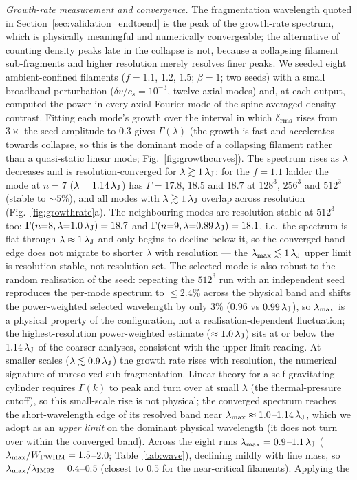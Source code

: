 \documentclass[usenatbib,twoside,twocolumn]{mnras}
\begin{document}
\emph{Growth-rate measurement and convergence.} The fragmentation wavelength quoted in Section~\ref{sec:validation_endtoend} is the peak of the growth-rate spectrum, which is physically meaningful and numerically convergeable; the alternative of counting density peaks late in the collapse is not, because a collapsing filament sub-fragments and higher resolution merely resolves finer peaks. We seeded eight ambient-confined filaments ($f=1.1$, $1.2$, $1.5$; $\beta=1$; two seeds) with a small broadband perturbation ($\delta v/c_s=10^{-3}$, twelve axial modes) and, at each output, computed the power in every axial Fourier mode of the spine-averaged density contrast. Fitting each mode's growth over the interval in which $\delta_{\rm rms}$ rises from $3\times$ the seed amplitude to $0.3$ gives $\Gamma(\lambda)$ (the growth is fast and accelerates towards collapse, so this is the dominant mode of a collapsing filament rather than a quasi-static linear mode; Fig.~\ref{fig:growthcurves}). The spectrum rises as $\lambda$ decreases and is resolution-converged for $\lambda\gtrsim1\,\lambda_{\rm J}$: for the $f=1.1$ ladder the mode at $n=7$ ($\lambda=1.14\,\lambda_{\rm J}$) has $\Gamma=17.8$, $18.5$ and $18.7$ at $128^3$, $256^3$ and $512^3$ (stable to $\sim5\%$), and all modes with $\lambda\gtrsim1\,\lambda_{\rm J}$ overlap across resolution (Fig.~\ref{fig:growthrate}a). The neighbouring modes are resolution-stable at $512^3$ too: $\Gamma(n{=}8,\lambda{=}1.0\,\lambda_{\rm J})=18.7$ and $\Gamma(n{=}9,\lambda{=}0.89\,\lambda_{\rm J})=18.1$, i.e.\ the spectrum is flat through $\lambda\approx1\,\lambda_{\rm J}$ and only begins to decline below it, so the converged-band edge does not migrate to shorter $\lambda$ with resolution --- the $\lambda_{\rm max}\lesssim1\,\lambda_{\rm J}$ upper limit is resolution-stable, not resolution-set. The selected mode is also robust to the random realisation of the seed: repeating the $512^3$ run with an independent seed reproduces the per-mode spectrum to $\leq2.4\%$ across the physical band and shifts the power-weighted selected wavelength by only $3\%$ ($0.96$ vs $0.99\,\lambda_{\rm J}$), so $\lambda_{\rm max}$ is a physical property of the configuration, not a realisation-dependent fluctuation; the highest-resolution power-weighted estimate ($\approx1.0\,\lambda_{\rm J}$) sits at or below the $1.14\,\lambda_{\rm J}$ of the coarser analyses, consistent with the upper-limit reading. At smaller scales ($\lambda\lesssim0.9\,\lambda_{\rm J}$) the growth rate rises with resolution, the numerical signature of unresolved sub-fragmentation. Linear theory for a self-gravitating cylinder requires $\Gamma(k)$ to peak and turn over at small $\lambda$ (the thermal-pressure cutoff), so this small-scale rise is not physical; the converged spectrum reaches the short-wavelength edge of its resolved band near $\lambda_{\rm max}\approx1.0$--$1.14\,\lambda_{\rm J}$, which we adopt as an \emph{upper limit} on the dominant physical wavelength (it does not turn over within the converged band). Across the eight runs $\lambda_{\rm max}=0.9$--$1.1\,\lambda_{\rm J}$ ($\lambda_{\rm max}/W_{\rm FWHM}=1.5$--$2.0$; Table~\ref{tab:wave}), declining mildly with line mass, so $\lambda_{\rm max}/\lambda_{\rm IM92}=0.4$--$0.5$ (closest to $0.5$ for the near-critical filaments). Applying the 
\end{document}
